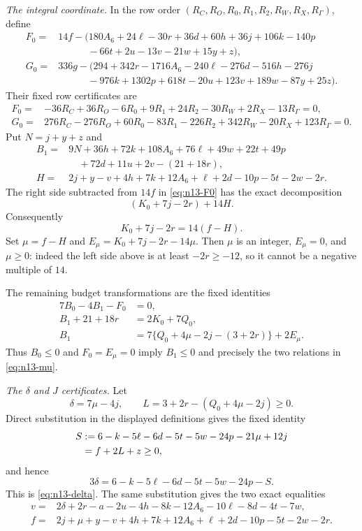 \smallskip
\noindent\emph{The integral coordinate.}
In the row order $(R_C,R_O,R_0,R_1,R_2,R_W,R_X,R_\Gamma)$, define
\begin{align*}
 F_0={}&14f-\bigl(180A_6+24\ell-30r+36d+60h+36j+106k-140p\\
      &\qquad\quad-66t+2u-13v-21w+15y+z\bigr),\\
 G_0={}&336g-\bigl(294+342r-1716A_6-240\ell-276d-516h-276j\\
      &\qquad\quad-976k+1302p+618t-20u+123v+189w-87y+25z\bigr).
\end{align*}
Their fixed row certificates are
\begin{align}
 F_0={}&-36R_C+36R_O-6R_0+9R_1+24R_2-30R_W+2R_X-13R_\Gamma=0,
                                                               \label{eq:n13-F0}\\
 G_0={}&276R_C-276R_O+60R_0-83R_1-226R_2+342R_W
         -20R_X+123R_\Gamma=0.                                \label{eq:n13-G0}
\end{align}
Put $N=j+y+z$ and
\begin{align*}
 B_1={}&9N+36h+72k+108A_6+76\ell+49w+22t+49p\\
       &\quad+72d+11u+2v-(21+18r),\\
 H={}&2j+y-v+4h+7k+12A_6+\ell+2d-10p-5t-2w-2r.
\end{align*}
The right side subtracted from $14f$ in \eqref{eq:n13-F0} has the exact
decomposition
\[
 (K_0+7j-2r)+14H.
\]
Consequently
\[
 K_0+7j-2r=14(f-H).
\]
Set $\mu=f-H$ and $E_\mu=K_0+7j-2r-14\mu$.  Then $\mu$ is an integer,
$E_\mu=0$, and $\mu\geq0$: indeed the left side above is at least
$-2r\geq-12$, so it cannot be a negative multiple of $14$.

The remaining budget transformations are the fixed identities
\begin{align}
 7B_0-4B_1-F_0&=0,                                  \label{eq:n13-B01}\\
 B_1+21+18r&=2K_0+7Q_0,                             \label{eq:n13-B1KQ}\\
 B_1&=7\{Q_0+4\mu-2j-(3+2r)\}+2E_\mu.              \label{eq:n13-B1mu}
\end{align}
Thus $B_0\leq0$ and $F_0=E_\mu=0$ imply $B_1\leq0$ and precisely the two
relations in \eqref{eq:n13-mu}.

\smallskip
\noindent\emph{The $\delta$ and $J$ certificates.}
Let
\[
 \delta=7\mu-4j,\qquad
 L=3+2r-(Q_0+4\mu-2j)\geq0.
\]
Direct substitution in the displayed definitions gives the fixed identity
\begin{align}
 S&:=6-k-5\ell-6d-5t-5w-24p-21\mu+12j\notag\\
  &=f+2L+z\geq0,                                    \label{eq:n13-S}
\end{align}
and hence
\[
 3\delta=6-k-5\ell-6d-5t-5w-24p-S.
\]
This is \eqref{eq:n13-delta}.  The same substitution gives the two exact
equalities
\begin{align}
 v={}&2\delta+2r-a-2u-4h-8k-12A_6-10\ell-8d-4t-7w,
                                                               \label{eq:n13-v-cert}\\
 f={}&2j+\mu+y-v+4h+7k+12A_6+\ell+2d
       -10p-5t-2w-2r.                              \label{eq:n13-f-cert}
\end{align}

